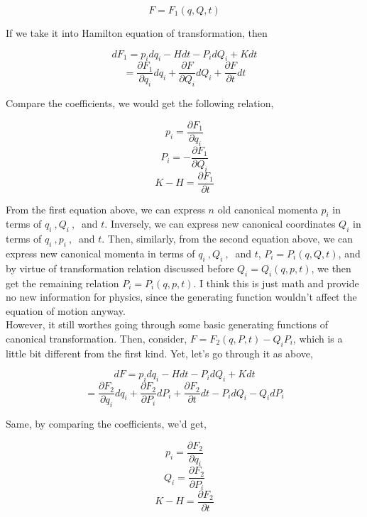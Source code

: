 \documentclass[12pt]{article}
\begin{document}
\begin{center}
    \[ F = F_1(q, Q, t) \]
\end{center}

If we take it into Hamilton equation of transformation, then

\begin{center}
    \[ dF_1 = p_idq_i - Hdt - P_idQ_i + Kdt \]
    \[ = \frac{\partial F_1}{\partial q_i} dq_i + \frac{\partial F}{\partial Q_i}dQ_i + \frac{\partial F}{\partial t}dt \]
\end{center}

Compare the coefficients, we would get the following relation,

\begin{center}
    \[ p_i = \frac{\partial F_1}{\partial q_i} \]
    \[ P_i = -\frac{\partial F_1}{\partial Q_i } \]
    \[ K - H = \frac{\partial F_1}{\partial t} \]
\end{center}

From the first equation above, we can express $n$ old canonical momenta $p_i$ in terms of $q_i\ , Q_i\ ,\ $ and $t$. Inversely, we can express new canonical coordinates $Q_i$ in terms of $q_i\ ,p_i\ ,\ $ and $t$. Then, similarly, from the second equation above, we can express new canonical momenta in terms of $q_i\ ,Q_i\ ,\ $ and $t$, $P_i = P_i(q, Q, t)$, and by virtue of transformation relation discussed before $Q_i = Q_i(q, p, t)$, we then get the remaining relation $P_i = P_i(q, p, t)$. I think this is just math and provide no new information for physics, since the generating function wouldn't affect the equation of motion anyway.
\\
\indent However, it still worthes going through some basic generating functions of canonical transformation. Then, consider, $F = F_2(q, P ,t) - Q_iP_i$, which is a little bit different from the first kind. Yet, let's go through it as above,

\begin{center}
    \[ dF = p_idq_i - Hdt - P_idQ_i + Kdt \]
    \[ = \frac{\partial F_2}{\partial q_i}dq_i + \frac{\partial F_2}{\partial P_i}dP_i + \frac{\partial F_2}{\partial t}dt - P_idQ_i - Q_idP_i \]
\end{center}

Same, by comparing the coefficients, we'd get,

\begin{center}
    \[ p_i = \frac{\partial F_2}{\partial q_i} \]
    \[ Q_i = \frac{\partial F_2}{\partial P_i} \]
    \[ K -H = \frac{\partial F_2}{\partial t} \]
\end{center}
\end{document}
